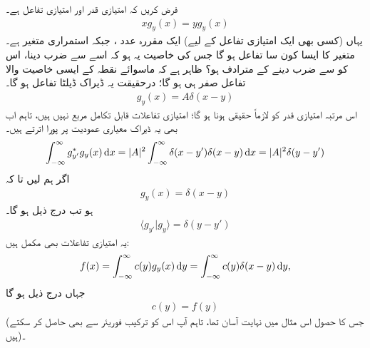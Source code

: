 \quad
فرض کریں کہ  امتیازی قدر اور  امتیازی تفاعل ہے۔
\begin{align}
xg_{y}(x) = yg_{y}(x) 
\end{align}
یہاں (کسی بھی ایک امتیازی تفاعل کے لیے)   ایک مقررہ عدد ،  جبکہ  استمراری متغیر ہے۔متغیر   کا  ایسا کون سا   تفاعل ہو گا جس کی  خاصیت یہ ہو  کہ اسے   سے ضرب دینا،  اس کو   سے ضرب دینے کے مترادف  ہو؟ ظاہر ہے کہ   ماسوائے نقطہ   کے    ایسی خاصیت والا تفاعل  صفر ہی ہو گا؛  درحقیقت یہ ڈیراک ڈیلٹا تفاعل ہو گا۔
\begin{align*}
g_{y}(x) = A\delta(x-y)
\end{align*}
اس  مرتبہ امتیازی   قدر کو    لازماً حقیقی   ہونا ہو  گا؛  امتیازی تفاعلات قابل تکامل مربع نہیں ہیں، تاہم  اب بھی یہ ڈیراک معیاری  عمودیت  پر پورا اترتے ہیں۔
\begin{align}
\int_{-\infty}^{\infty}g_{y'}^{*}g_{y}(x) \dif x = |A|^{2}\int_{-\infty}^{\infty}\delta(x-y')\delta(x-y) \dif x = |A|^{2} \delta (y-y')
\end{align}
اگر ہم  لیں تا کہ
\begin{align}\label{مساوات_قواعد_ڈیراک_استعمال}
g_{y}(x) = \delta (x-y)
\end{align}
ہو تب درج ذیل ہو گا۔
\begin{align}
\langle g_{y'} | g_{y} \rangle = \delta (y-y')
\end{align}
یہ  امتیازی  تفاعلات بھی مکمل ہیں:
\begin{align}
f(x) = \int_{-\infty}^{\infty} c(y)g_{y}(x) \dif y = \int_{-\infty}^{\infty} c(y)\delta(x-y)\dif y,
\end{align}
جہاں درج ذیل ہو گا
\begin{align}
c(y) = f(y)
\end{align}
(جس کا حصول اس مثال میں  نہایت آسان   تھا، تاہم  آپ اس کو ترکیب  فوریئر  سے بھی حاصل کر سکتے ہیں)۔

